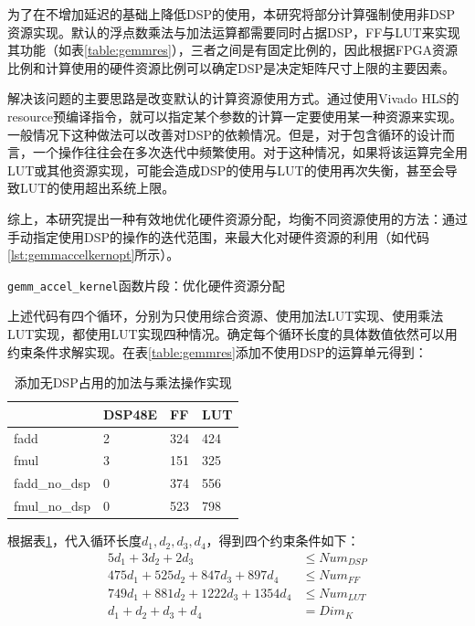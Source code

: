 为了在不增加延迟的基础上降低DSP的使用，本研究将部分计算强制使用非DSP资源实现。默认的浮点数乘法与加法运算都需要同时占据DSP，FF与LUT来实现其功能（如表\ref{table:gemmres}），三者之间是有固定比例的，因此根据FPGA资源比例和计算使用的硬件资源比例可以确定DSP是决定矩阵尺寸上限的主要因素。

解决该问题的主要思路是改变默认的计算资源使用方式。通过使用Vivado HLS的resource预编译指令，就可以指定某个参数的计算一定要使用某一种资源来实现。一般情况下这种做法可以改善对DSP的依赖情况。但是，对于包含循环的设计而言，一个操作往往会在多次迭代中频繁使用。对于这种情况，如果将该运算完全用LUT或其他资源实现，可能会造成DSP的使用与LUT的使用再次失衡，甚至会导致LUT的使用超出系统上限。

综上，本研究提出一种有效地优化硬件资源分配，均衡不同资源使用的方法：通过手动指定使用DSP的操作的迭代范围，来最大化对硬件资源的利用（如代码\ref{lst:gemmaccelkernopt}所示）。

\begin{listing}[!ht]

\caption{\texttt{gemm\_accel\_kernel}函数片段：优化硬件资源分配}
\label{lst:gemmaccelkernopt}
\end{listing}

上述代码有四个循环，分别为只使用综合资源、使用加法LUT实现、使用乘法LUT实现，都使用LUT实现四种情况。确定每个循环长度的具体数值依然可以用约束条件求解实现。在表\ref{table:gemmres}添加不使用DSP的运算单元得到：

\begin{table}[!ht]
	\centering
	\begin{tabular}{|l|l|l|l|}
		\hline
		& DSP48E & FF & LUT \\ \hline
		fadd 			& 2 & 324 & 424 \\ \hline
		fmul 			& 3 & 151 & 325 \\ \hline
		fadd\_no\_dsp 	& 0 & 374 & 556 \\ \hline
		fmul\_no\_dsp 	& 0 & 523 & 798 \\ \hline
	\end{tabular}

	\caption{添加无DSP占用的加法与乘法操作实现}
	\label{table:gemmresnodsp}
\end{table}

根据表\ref{table:gemmresnodsp}，代入循环长度\(d_1,d_2,d_3,d_4\)，得到四个约束条件如下：
\begin{align}
\mathit{5d_1+3d_2+2d_3} & \leq \mathit{Num_{DSP}} 
\label{eq:dspopt} \\
\mathit{475d_1+525d_2+847d_3+897d_4}& \leq \mathit{Num_{FF}} 
\label{eq:ffopt} \\
\mathit{749d_1+881d_2+1222d_3+1354d_4}& \leq \mathit{Num_{LUT}} 
\label{eq:lutopt]} \\
\mathit{d_1+d_2+d_3+d_4}& = \mathit{Dim_K}
\end{align}

